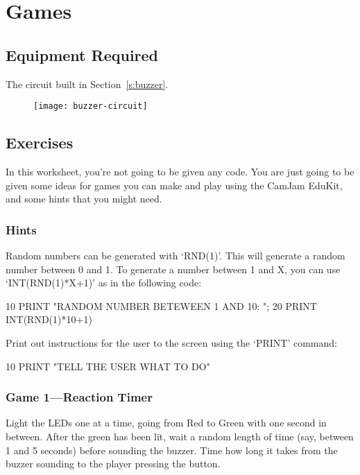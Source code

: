 \section{Games}


\subsection*{Equipment Required}

The circuit built in Section~\ref{s:buzzer}.

\begin{figure}[htbp]
  \centering
  \texttt{[image: buzzer-circuit]}
\end{figure}

\subsection*{Exercises}

In this worksheet, you're not going to be given any code.  You are just going to be given some ideas for games you can make and play using the CamJam EduKit, and some hints that you might need.

\subsubsection*{Hints}

Random numbers can be generated with `RND(1)'.  This will generate a random number between 0 and 1.  To generate a number between 1 and X, you can use `INT(RND(1)*X+1)' as in the following code:
\begin{basic}
10 PRINT "RANDOM NUMBER BETEWEEN 1 AND 10: ";
20 PRINT INT(RND(1)*10+1)
\end{basic}

Print out instructions for the user to the screen using the `PRINT' command:
\begin{basic}
10 PRINT "TELL THE USER WHAT TO DO"
\end{basic}

\subsubsection*{Game 1---Reaction Timer}

Light the LEDs one at a time, going from Red to Green with one second in between.  After the green has been lit, wait a random length of time (say, between 1 and 5 seconds) before sounding the buzzer.  Time how long it takes from the buzzer sounding to the player pressing the button.

